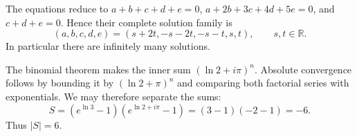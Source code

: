 The equations reduce to $a+b+c+d+e=0$, $a+2b+3c+4d+5e=0$, and $c+d+e=0$. Hence their complete solution family is
\[
(a,b,c,d,e)=(s+2t,-s-2t,-s-t,s,t),\qquad s,t\in\mathbb R.
\]
In particular there are infinitely many solutions.

The binomial theorem makes the inner sum $(\ln2+i\pi)^n$. Absolute convergence follows by bounding it by $(\ln2+\pi)^n$ and comparing both factorial series with exponentials. We may therefore separate the sums:
\[
S=(e^{\ln3}-1)(e^{\ln2+i\pi}-1)=(3-1)(-2-1)=-6.
\]
Thus $\boxed{|S|=6}$.
